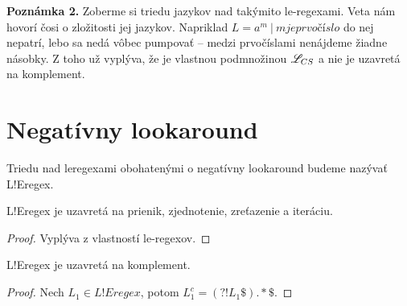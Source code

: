 \textbf{Poznámka 2.}
Zoberme si triedu jazykov nad takýmito le-regexami. Veta nám hovorí čosi o zložitosti jej jazykov. Napriklad $L = {a^m ~|~ m je prvočíslo}$ do nej nepatrí, lebo sa nedá vôbec pumpovať -- medzi prvočíslami nenájdeme žiadne násobky. Z toho už vyplýva, že je vlastnou podmnožinou $\mathscr{L}_{CS}$ a nie je uzavretá na komplement.

\section{Negatívny lookaround}\label{chap:negla}

\begin{df}
Triedu nad leregexami obohatenými o negatívny lookaround budeme nazývať L!Eregex.
\end{df}

\begin{veta}
L!Eregex je uzavretá na prienik, zjednotenie, zreťazenie a iteráciu.
\end{veta}
\begin{proof}
Vyplýva z vlastností le-regexov.
\end{proof}

\begin{veta}
L!Eregex je uzavretá na komplement.
\end{veta}
\begin{proof}
Nech $L_1 \in L!Eregex$, potom $L_1^c  = \left( ?! L_1 \mathdollar \right) .* \mathdollar $.
\end{proof}
